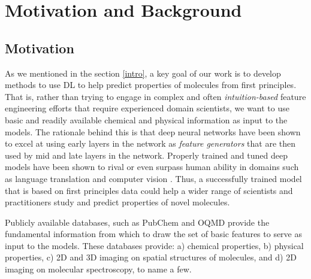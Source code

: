 \section{Motivation and Background  \label{background}}
\subsection{Motivation}
As we mentioned in the section \ref{intro}, a key goal of our work is to develop methods to use DL to help predict properties of molecules from first principles. That is, rather than trying to engage in complex and often {\em intuition-based} feature engineering efforts that require experienced domain scientists, we want to use basic and readily available chemical and physical information as input to the models. The rationale behind this is that deep neural networks have been shown to excel at using early layers in the network as {\em feature generators} that are then used by mid and late layers in the network. Properly trained and tuned deep models have been shown to rival or even surpass  human ability in domains such as language translation and computer vision \cite{bert-transformer} \cite{attention}. Thus, a successfully trained model that is based on first principles data could help a wider range of scientists and practitioners study and predict properties of novel molecules. 

Publicly available databases, such as PubChem \cite{pubchem} and OQMD \cite{OQMD1} \cite{OQMD2} provide the fundamental information from which to draw the set of basic features to serve as input  to the models. These databases provide: a) chemical properties, b) physical properties, c) 2D and 3D imaging on spatial structures of molecules,  and d) 2D imaging on molecular spectroscopy, to name a few.

